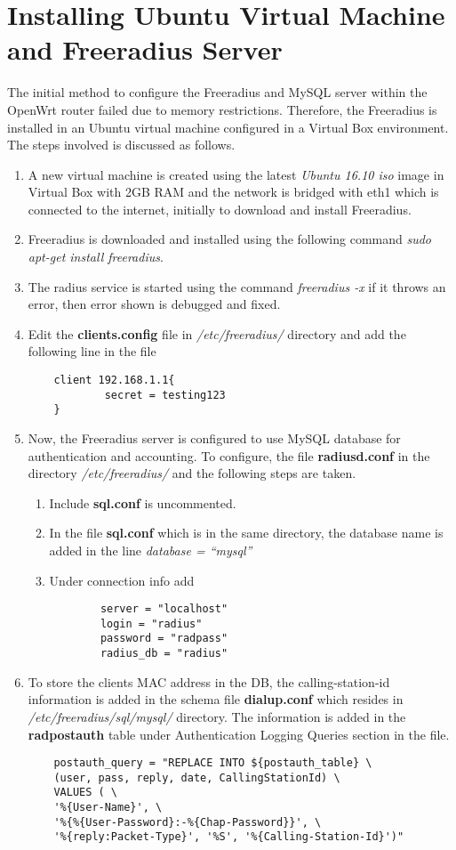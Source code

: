 \section{Installing Ubuntu Virtual Machine and Freeradius Server \cite{Freeradius_install}}
The initial method to configure the Freeradius and MySQL server within the OpenWrt router failed due to memory restrictions. Therefore, the Freeradius is installed in an Ubuntu virtual machine configured in a Virtual Box environment. The steps involved is discussed as follows.
\begin{enumerate}
	\item A new virtual machine is created using the latest \textit{Ubuntu 16.10 iso} image in Virtual Box with 2GB RAM and the network is bridged with eth1 which is connected to the internet, initially to download and install Freeradius.
	\item Freeradius is downloaded and installed using the following command \textit{sudo apt-get install freeradius}.
	\item The radius service is started using the command \textit{freeradius -x} if it throws an error, then error shown is debugged and fixed.
	\item Edit the \textbf{clients.config} file in \textit{/etc/freeradius/} directory and add the following line in the file 
	\begin{lstlisting}
	client 192.168.1.1{
			secret = testing123
	}
	\end{lstlisting}
	
	\item Now, the Freeradius server is configured to use MySQL database for authentication and accounting. To configure, the file \textbf{radiusd.conf} in the directory \textit{/etc/freeradius/} and the following steps are taken.
	\begin{enumerate}
		\item Include \textbf{sql.conf} is uncommented.
		\item In the file \textbf{sql.conf} which is in the same directory, the database name is added in the line \textit{database = “mysql”}
		\item Under connection info add 
		\begin{lstlisting}
		server = "localhost"
		login = "radius"
		password = "radpass"
		radius_db = "radius"
		\end{lstlisting}
	\end{enumerate}
	
	\item To store the clients MAC address in the DB, the calling-station-id information is added in the schema file \textbf{dialup.conf} which resides in \textit{/etc/freeradius/sql/mysql/} directory. The information is added in the \textbf{radpostauth} table under Authentication Logging Queries section in the file.
	\begin{lstlisting}
	postauth_query = "REPLACE INTO ${postauth_table} \
	(user, pass, reply, date, CallingStationId) \
	VALUES ( \
	'%{User-Name}', \
	'%{%{User-Password}:-%{Chap-Password}}', \
	'%{reply:Packet-Type}', '%S', '%{Calling-Station-Id}')"
	\end{lstlisting}


\end{enumerate}
